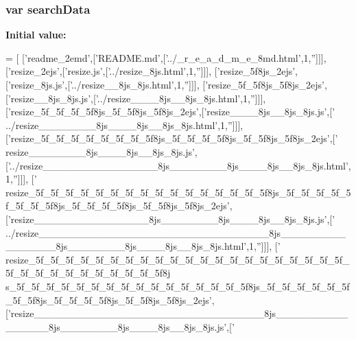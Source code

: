 \subsubsection[{search\+Data}]{\setlength{\rightskip}{0pt plus 5cm}var search\+Data}\label{files__b_8js_ad01a7523f103d6242ef9b0451861231e}
{\bfseries Initial value\+:}
\begin{DoxyCode}
=
[
  [\textcolor{stringliteral}{'readme\_2emd'},[\textcolor{stringliteral}{'README.md'},[\textcolor{stringliteral}{'../\_r\_e\_a\_d\_m\_e\_8md.html'},1,\textcolor{stringliteral}{''}]]],
  [\textcolor{stringliteral}{'resize\_2ejs'},[\textcolor{stringliteral}{'resize.js'},[\textcolor{stringliteral}{'../resize\_8js.html'},1,\textcolor{stringliteral}{''}]]],
  [\textcolor{stringliteral}{'resize\_5f8js\_2ejs'},[\textcolor{stringliteral}{'resize\_8js.js'},[\textcolor{stringliteral}{'../resize\_\_8js\_8js.html'},1,\textcolor{stringliteral}{''}]]],
  [\textcolor{stringliteral}{'resize\_5f\_5f8js\_5f8js\_2ejs'},[\textcolor{stringliteral}{'resize\_\_8js\_8js.js'},[\textcolor{stringliteral}{'../resize\_\_\_\_8js\_\_8js\_8js.html'},1,\textcolor{stringliteral}{''}]]],
  [\textcolor{stringliteral}{'resize\_5f\_5f\_5f\_5f8js\_5f\_5f8js\_5f8js\_2ejs'},[\textcolor{stringliteral}{'resize\_\_\_\_8js\_\_8js\_8js.js'},[\textcolor{stringliteral}{'
      ../resize\_\_\_\_\_\_\_\_8js\_\_\_\_8js\_\_8js\_8js.html'},1,\textcolor{stringliteral}{''}]]],
  [\textcolor{stringliteral}{'resize\_5f\_5f\_5f\_5f\_5f\_5f\_5f\_5f8js\_5f\_5f\_5f\_5f8js\_5f\_5f8js\_5f8js\_2ejs'},[\textcolor{stringliteral}{'
      resize\_\_\_\_\_\_\_\_8js\_\_\_\_8js\_\_8js\_8js.js'},[\textcolor{stringliteral}{'../resize\_\_\_\_\_\_\_\_\_\_\_\_\_\_\_\_8js\_\_\_\_\_\_\_\_8js\_\_\_\_8js\_\_8js\_8js.html'},1,\textcolor{stringliteral}{''}]]],
  [\textcolor{stringliteral}{'
      resize\_5f\_5f\_5f\_5f\_5f\_5f\_5f\_5f\_5f\_5f\_5f\_5f\_5f\_5f\_5f\_5f8js\_5f\_5f\_5f\_5f\_5f\_5f\_5f\_5f8js\_5f\_5f\_5f\_5f8js\_5f\_5f8js\_5f8js\_2ejs'},[\textcolor{stringliteral}{'resize\_\_\_\_\_\_\_\_\_\_\_\_\_\_\_\_8js\_\_\_\_\_\_\_\_8js\_\_\_\_8js\_\_8js\_8js.js'},[\textcolor{stringliteral}{'
      ../resize\_\_\_\_\_\_\_\_\_\_\_\_\_\_\_\_\_\_\_\_\_\_\_\_\_\_\_\_\_\_\_\_8js\_\_\_\_\_\_\_\_\_\_\_\_\_\_\_\_8js\_\_\_\_\_\_\_\_8js\_\_\_\_8js\_\_8js\_8js.html'},1,\textcolor{stringliteral}{''}]]],
  [\textcolor{stringliteral}{'
      resize\_5f\_5f\_5f\_5f\_5f\_5f\_5f\_5f\_5f\_5f\_5f\_5f\_5f\_5f\_5f\_5f\_5f\_5f\_5f\_5f\_5f\_5f\_5f\_5f\_5f\_5f\_5f\_5f\_5f\_5f\_5f\_5f8j
      s\_5f\_5f\_5f\_5f\_5f\_5f\_5f\_5f\_5f\_5f\_5f\_5f\_5f\_5f\_5f\_5f8js\_5f\_5f\_5f\_5f\_5f\_5f\_5f\_5f8js\_5f\_5f\_5f\_5f8js\_5f\_5f8js\_5f8js\_2ejs'},[\textcolor{stringliteral}{'resize\_\_\_\_\_\_\_\_\_\_\_\_\_\_\_\_\_\_\_\_\_\_\_\_\_\_\_\_\_\_\_\_8js\_\_\_\_\_\_\_\_\_\_\_\_\_\_\_\_8js\_\_\_\_\_\_\_\_8js\_\_\_\_8js\_\_8js\_8js.js'},[\textcolor{stringliteral}{'
}
\end{DoxyCode}

